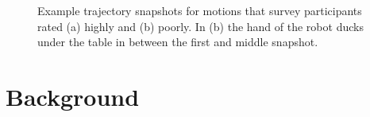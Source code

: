 \documentclass[letterpaper, 10 pt, conference]{ieeeconf}  %
\newcommand{\bta}[3]{pictures/example_traj/Bad/#1-snapshot-#3-#2}
\begin{document}
\begin{figure}
\caption{Example trajectory snapshots for motions that survey participants rated (a) highly and (b) poorly. In (b) the hand of the robot ducks under the table in between the first and middle snapshot.}\label{fig:example_trajectory}
\vspace{-0.2in}
\end{figure}

\section{Background}
\label{sec:background}
\end{document}
